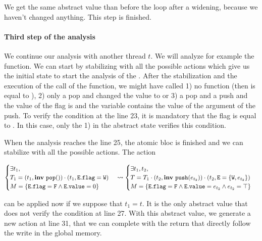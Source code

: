 We get the same abstract value than before the loop after a widening, because we haven't changed anything. This step is finished.








\paragraph{Third step of the analysis} We continue our analysis with another thread $t$. We will analyze for example the  function. We can start by stabilizing with all the possible actions which give us the initial state to start the analysis of the .
After the stabilization and the execution of the call of the function, we might have called 1) no function (then  is equal to ), 2) only a pop and changed the  value to  or 3) a pop and a push and the value of the flag is  and the variable  contains the value of the argument of the push.
To verify the condition at the line 23, it is mandatory that the flag is equal to . In this case, only the 1) in the abstract state verifies this condition. 

When the analysis reaches the line 25, the atomic bloc is finished and we can stabilize with all the possible actions. The action 
\begin{scriptsize}
\[\begin{cases}
	\exists t_1, \\
	T_1 = (t_1, \mathbf{inv}\ \mathtt{pop}())\cdot (t_1, \mathtt{E.flag} = \mathtt{W}) \\
	M = \{\mathtt{E.flag} = \mathtt{F} \wedge \mathtt{E.value} = 0\}
\end{cases} 
\leadsto
\begin{cases}
	\exists t_1, t_2,\\
	T = T_1 \cdot (t_2, \mathbf{inv}\ \mathtt{push}(e_{t_2})) \cdot (t_2, \mathtt{E} = \{\mathtt{W}, e_{t_2}\})\\
	M = \{\mathtt{E.flag} = \mathtt{F} \wedge \mathtt{E.value} = e_{t_2} \wedge e_{t_2} = \top\}
\end{cases}
\] \end{scriptsize}
can be applied now if we suppose that $t_1 = t$. It is the only abstract value that does not verify the condition at line 27. With this abstract value, we generate a new action at line 31, that we can complete with the return that directly follow the write in the global memory. 

